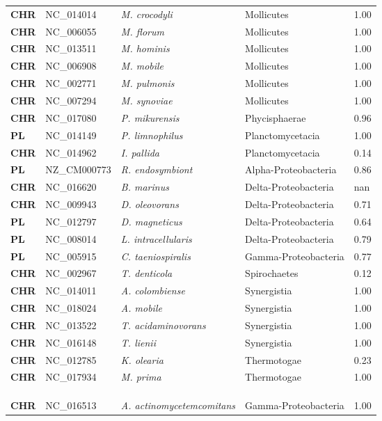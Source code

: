 \begin{adjustwidth}{-3cm}{2cm}
{\begin{supertabular}{>{\bfseries}l|p{0.1\textwidth}p{0.14\textwidth}l|l}
CHR & NC\_014014 & \textit{M. crocodyli} & Mollicutes & 1.00\\
CHR & NC\_006055 & \textit{M. florum} & Mollicutes & 1.00\\
CHR & NC\_013511 & \textit{M. hominis} & Mollicutes & 1.00\\
CHR & NC\_006908 & \textit{M. mobile} & Mollicutes & 1.00\\
CHR & NC\_002771 & \textit{M. pulmonis} & Mollicutes & 1.00\\
CHR & NC\_007294 & \textit{M. synoviae} & Mollicutes & 1.00\\
CHR & NC\_017080 & \textit{P. mikurensis} & Phycisphaerae & 0.96\\
PL & NC\_014149 & \textit{P. limnophilus} & Planctomycetacia & 1.00\\
CHR & NC\_014962 & \textit{I. pallida} & Planctomycetacia & 0.14\\
PL & NZ\_CM000773 & \textit{R. endosymbiont} & Alpha-Proteobacteria & 0.86\\
CHR & NC\_016620 & \textit{B. marinus} & Delta-Proteobacteria & nan\\
CHR & NC\_009943 & \textit{D. oleovorans} & Delta-Proteobacteria & 0.71\\
PL & NC\_012797 & \textit{D. magneticus} & Delta-Proteobacteria & 0.64\\
PL & NC\_008014 & \textit{L. intracellularis} & Delta-Proteobacteria & 0.79\\
PL & NC\_005915 & \textit{C. taeniospiralis} & Gamma-Proteobacteria & 0.77\\
CHR & NC\_002967 & \textit{T. denticola} & Spirochaetes & 0.12\\
CHR & NC\_014011 & \textit{A. colombiense} & Synergistia & 1.00\\
CHR & NC\_018024 & \textit{A. mobile} & Synergistia & 1.00\\
CHR & NC\_013522 & \textit{T. acidaminovorans} & Synergistia & 1.00\\
CHR & NC\_016148 & \textit{T. lienii} & Synergistia & 1.00\\
CHR & NC\_012785 & \textit{K. olearia} & Thermotogae & 0.23\\
CHR & NC\_017934 & \textit{M. prima} & Thermotogae & 1.00\\
\\
\\
\hline\\
CHR & NC\_016513 & \textit{A. actinomycetemcomitans} & Gamma-Proteobacteria & 1.00\\

\end{supertabular}}
\end{adjustwidth}
